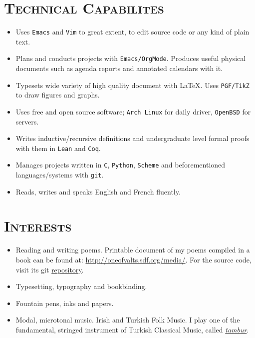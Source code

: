 \documentclass[oneside]{memoir}
\begin{document}
\section*{\textsc{Technical Capabilites}}
\begin{itemize}[leftmargin=*]
  \item Uses \texttt{Emacs} and \texttt{Vim} to great extent, to edit
  source code or any kind of plain text.
  \item Plans and conducts projects with \texttt{Emacs/OrgMode}.
  Produces useful physical documents such as agenda reports and
  annotated calendars with it.
  \item Typesets wide variety of high quality document with \LaTeX. Uses
  \texttt{PGF/TikZ} to draw figures and graphs.
  \item Uses free and open source software; \texttt{Arch Linux} for daily
    driver, \texttt{OpenBSD} for servers.
  \item Writes inductive/recursive definitions and undergraduate level
    formal proofs with them in \texttt{Lean} and \texttt{Coq}.
  \item Manages projects written in \texttt{C}, \texttt{Python},
  \texttt{Scheme} and beforementioned languages/systems with
  \texttt{git}.
  \item Reads, writes and speaks English and French fluently.
\end{itemize}
\section*{\textsc{Interests}}
\begin{itemize}[leftmargin=*]
  \item Reading and writing poems. Printable document of my poems
    compiled in a book can be found at:
    \url{http://oneofvalts.sdf.org/media/}. For the source code, visit
    its git \href{https://github.com/oneofvalts/usavurdu}{repository}.
  \item Typesetting, typography and bookbinding.
  \item Fountain pens, inks and papers.
  \item Modal, microtonal music. Irish and Turkish Folk Music. I play one
    of the fundamental, stringed instrument of Turkish Classical Music,
    called
    \href{https://en.wikipedia.org/wiki/Turkish_tambur}{\textit{tambur}}.
\end{itemize}
\end{document}
